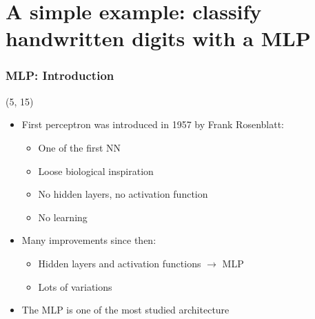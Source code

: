 \section[A simple example: MLP]{A simple example: classify handwritten digits with a \acl{MLP}}

\begin{frame}

  \frametitle{\acl{MLP}: Introduction}

  \begin{textblock}{55}(5, 15)
    \begin{itemize}
    \item<1-> First perceptron was introduced in 1957 by Frank Rosenblatt:
      \begin{itemize}
      \item One of the first \acl{NN}
      \item Loose biological inspiration
      \item No hidden layers, no activation function
      \item No learning
      \end{itemize}
    \item<2-> Many improvements since then:
      \begin{itemize}
      \item Hidden layers and activation functions $\rightarrow$ \ac{MLP}
      \item Lots of variations
      \end{itemize}
    \item<3-> The \ac{MLP} is one of the most studied architecture
    \end{itemize}
  \end{textblock}


\end{frame}
